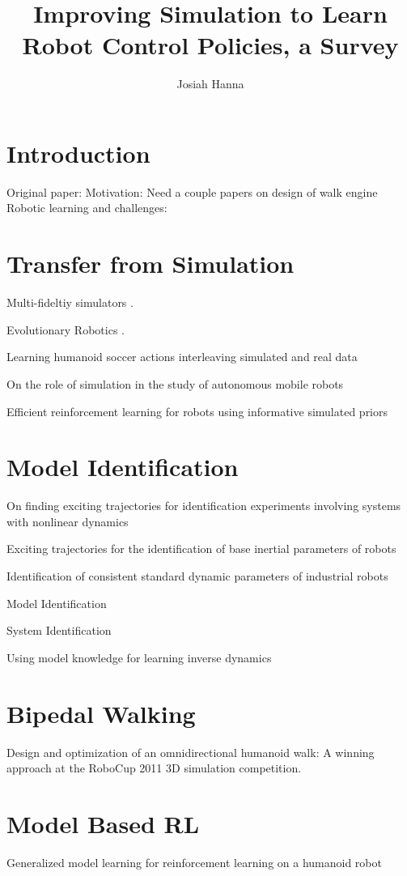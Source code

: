 \documentclass[12 pt]{article}
\author{Josiah Hanna}
\title{Improving Simulation to Learn Robot Control Policies, a Survey}
\begin{document}
\maketitle

\section{Introduction}

Original paper: \cite{farchy2013humanoid}
Motivation: Need a couple papers on design of walk engine
Robotic learning and challenges: \cite{kober2013reinforcement}


\section{Transfer from Simulation}
Multi-fideltiy simulators \cite{cutler2014reinforcement}.

Evolutionary Robotics \cite{koos2010crossing}.

Learning humanoid soccer actions interleaving simulated and real data

On the role of simulation in the study of autonomous mobile robots

Efficient reinforcement learning for robots using informative simulated priors

\section{Model Identification}

On finding exciting trajectories for identification experiments involving systems with nonlinear dynamics

Exciting trajectories for the identification of base inertial parameters of robots

Identification of consistent standard dynamic parameters of industrial robots

Model Identification

System Identification

Using model knowledge for learning inverse dynamics

\section{Bipedal Walking}

Design and optimization of an omnidirectional humanoid walk: A winning approach at the RoboCup 2011 3D simulation competition.

\section{Model Based RL}
Generalized model learning for reinforcement learning on a humanoid robot
\end{document}
